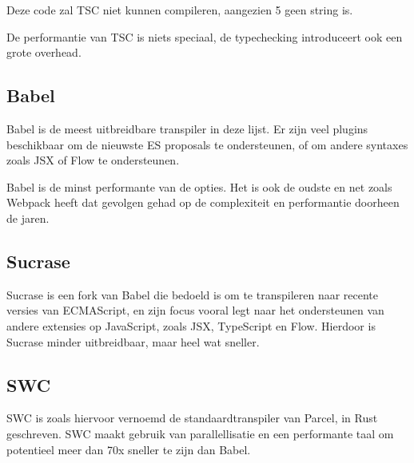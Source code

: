 Deze code zal TSC niet kunnen compileren, aangezien 5 geen string is.

De performantie van TSC is niets speciaal, de typechecking introduceert ook een grote overhead.

\subsection{Babel}

Babel is de meest uitbreidbare transpiler in deze lijst. Er zijn veel plugins beschikbaar om de nieuwste ES proposals te ondersteunen, of om andere syntaxes zoals JSX of Flow te ondersteunen.

Babel is de minst performante van de opties. Het is ook de oudste en net zoals Webpack heeft dat gevolgen gehad op de complexiteit en performantie doorheen de jaren. 

\subsection{Sucrase}

Sucrase is een fork van Babel die bedoeld is om te transpileren naar recente versies van ECMAScript, en zijn focus vooral legt naar het ondersteunen van andere extensies op JavaScript, zoals JSX, TypeScript en Flow. Hierdoor is Sucrase minder uitbreidbaar, maar heel wat sneller. \autocite{pierce}

\subsection{SWC}

SWC is zoals hiervoor vernoemd de standaardtranspiler van Parcel, in Rust geschreven. SWC maakt gebruik van parallellisatie en een performante taal om potentieel meer dan 70x sneller te zijn dan Babel. \autocite{swc}

